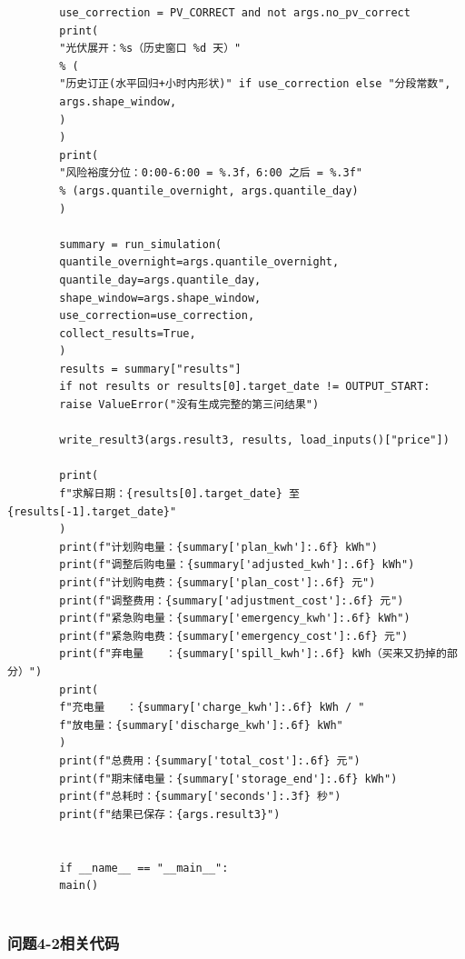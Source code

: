\documentclass[UTF8]{ctexart}
\begin{document}
\begin{verbatim}
        use_correction = PV_CORRECT and not args.no_pv_correct
        print(
        "光伏展开：%s（历史窗口 %d 天）"
        % (
        "历史订正(水平回归+小时内形状)" if use_correction else "分段常数",
        args.shape_window,
        )
        )
        print(
        "风险裕度分位：0:00-6:00 = %.3f，6:00 之后 = %.3f"
        % (args.quantile_overnight, args.quantile_day)
        )
        
        summary = run_simulation(
        quantile_overnight=args.quantile_overnight,
        quantile_day=args.quantile_day,
        shape_window=args.shape_window,
        use_correction=use_correction,
        collect_results=True,
        )
        results = summary["results"]
        if not results or results[0].target_date != OUTPUT_START:
        raise ValueError("没有生成完整的第三问结果")
        
        write_result3(args.result3, results, load_inputs()["price"])
        
        print(
        f"求解日期：{results[0].target_date} 至 {results[-1].target_date}"
        )
        print(f"计划购电量：{summary['plan_kwh']:.6f} kWh")
        print(f"调整后购电量：{summary['adjusted_kwh']:.6f} kWh")
        print(f"计划购电费：{summary['plan_cost']:.6f} 元")
        print(f"调整费用：{summary['adjustment_cost']:.6f} 元")
        print(f"紧急购电量：{summary['emergency_kwh']:.6f} kWh")
        print(f"紧急购电费：{summary['emergency_cost']:.6f} 元")
        print(f"弃电量　　：{summary['spill_kwh']:.6f} kWh（买来又扔掉的部分）")
        print(
        f"充电量　　：{summary['charge_kwh']:.6f} kWh / "
        f"放电量：{summary['discharge_kwh']:.6f} kWh"
        )
        print(f"总费用：{summary['total_cost']:.6f} 元")
        print(f"期末储电量：{summary['storage_end']:.6f} kWh")
        print(f"总耗时：{summary['seconds']:.3f} 秒")
        print(f"结果已保存：{args.result3}")
        
        
        if __name__ == "__main__":
        main()
        
    \end{verbatim}
    
    \subsubsection*{问题4-2相关代码}
    
\end{document}

